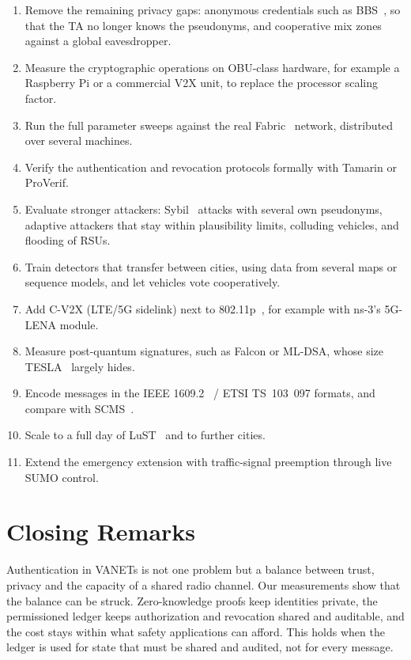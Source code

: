 \begin{enumerate}
  \item Remove the remaining privacy gaps: anonymous credentials such as BBS~\cite{boneh2004bbs}, so
  that the TA no longer knows the pseudonyms, and cooperative mix
  zones~\cite{beresford2003mix,freudiger2007mix} against a global eavesdropper.
  \item Measure the cryptographic operations on OBU-class hardware, for example a Raspberry Pi or a
  commercial V2X unit, to replace the processor scaling factor.
  \item Run the full parameter sweeps against the real Fabric~\cite{androulaki2018fabric} network, distributed over several
  machines.
  \item Verify the authentication and revocation protocols formally with Tamarin or ProVerif.
  \item Evaluate stronger attackers: Sybil~\cite{xiao2006sybil} attacks with several own pseudonyms, adaptive attackers
  that stay within plausibility limits, colluding vehicles, and flooding of RSUs.
  \item Train detectors that transfer between cities, using data from several maps or sequence
  models, and let vehicles vote cooperatively.
  \item Add C-V2X (LTE/5G sidelink) next to 802.11p~\cite{jiang2008wave}, for example with ns-3's 5G-LENA module.
  \item Measure post-quantum signatures, such as Falcon or ML-DSA, whose size TESLA~\cite{perrig2000tesla} largely hides.
  \item Encode messages in the IEEE 1609.2~\cite{ieee16092} / ETSI TS~103~097 formats, and compare with SCMS~\cite{brecht2018scms}.
  \item Scale to a full day of LuST~\cite{codeca2015lust} and to further cities.
  \item Extend the emergency extension with traffic-signal preemption through live SUMO control.
\end{enumerate}

\section{Closing Remarks}

Authentication in VANETs is not one problem but a balance between trust, privacy and the capacity of
a shared radio channel. Our measurements show that the balance can be struck. Zero-knowledge proofs
keep identities private, the permissioned ledger keeps authorization and revocation shared and
auditable, and the cost stays within what safety applications can afford. This holds when the
ledger is used for state that must be shared and audited, not for every message.
